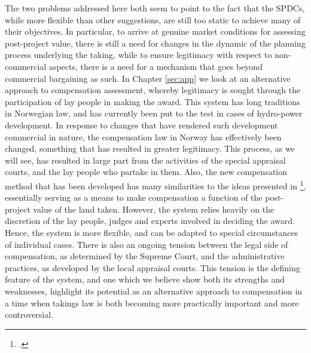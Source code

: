 The two problems addressed here both seem to point to the fact that the SPDCs, while more flexible than other suggestions, are still too static to achieve many of their objectives. In particular, to arrive at genuine market conditions for assessing post-project value, there is still a need for changes in the dynamic of the planning process underlying the taking, while to ensure legitimacy with respect to non-commercial aspects, there is a need for a mechanism that goes beyond commercial bargaining as such. In Chapter \ref{sec:app} we look at an alternative approach to compensation assessment, whereby legitimacy is sought through the participation of lay people in making the award. This system has long traditions in Norwegian law, and has currently been put to the test in cases of hydro-power development. In response to changes that have rendered such development commercial in nature, the compensation law in Norway has effectively been changed, something that has resulted in greater legitimacy. This process, as we will see, has resulted in large part from the activities of the special appraisal courts, and the lay people who partake in them. Also, the new compensation method that has been developed has many similarities to the ideas presented in \footcite{eminc07}, essentially serving as a means to make compensation a function of the post-project value of the land taken. However, the system relies heavily on the discretion of the lay people, judges and experts involved in deciding the award. Hence, the system is more flexible, and can be adapted to special circumstances of individual cases. There is also an ongoing tension between the legal side of compensation, as determined by the Supreme Court, and the administrative practices, as developed by the local appraisal courts. This tension is the defining feature of the system, and one which we believe show both its strengths and weaknesses, highlight its potential as an alternative approach to compensation in a time when takings law is both becoming more practically important and more controversial.

